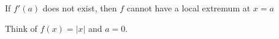 \documentclass{ximera}
\author{Steven Gubkin}
\begin{document}
\begin{exercise}


	If $f'(a)$ does not exist, then $f$ cannot have a local extremum at $x=a$
\begin{hint}
Think of $f(x)=|x|$ and $a=0$.
\end{hint}
	\begin{multipleChoice}	
	\end{multipleChoice}

\end{exercise}
\end{document}
